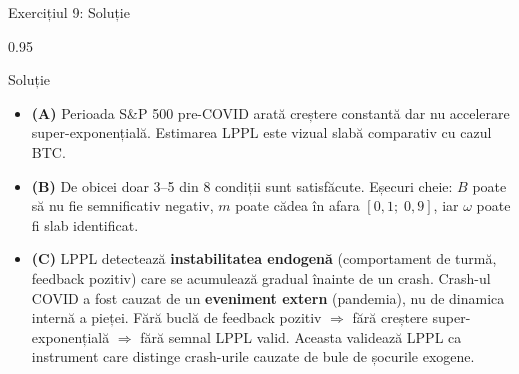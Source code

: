 \documentclass[9pt, aspectratio=169, t]{beamer}
\begin{document}
\begin{frame}{Exercițiul 9: Soluție}
    \begin{cminipage}{0.95\textwidth}
    \begin{exampleblock}{Soluție}
        {\small
        \begin{itemize}\setlength{\itemsep}{3pt}
            \item \textcolor{MainBlue}{\textbf{(A)}} Perioada S\&P 500 pre-COVID arată creștere constantă dar nu accelerare super-exponențială. Estimarea LPPL este vizual slabă comparativ cu cazul BTC.
            \item \textcolor{MainBlue}{\textbf{(B)}} De obicei doar 3--5 din 8 condiții sunt satisfăcute. Eșecuri cheie: $B$ poate să nu fie semnificativ negativ, $m$ poate cădea în afara $[0{,}1;\; 0{,}9]$, iar $\omega$ poate fi slab identificat.
            \item \textcolor{MainBlue}{\textbf{(C)}} LPPL detectează \textbf{instabilitatea endogenă} (comportament de turmă, feedback pozitiv) care se acumulează gradual înainte de un crash. Crash-ul COVID a fost cauzat de un \textbf{eveniment extern} (pandemia), nu de dinamica internă a pieței. Fără buclă de feedback pozitiv $\Rightarrow$ fără creștere super-exponențială $\Rightarrow$ fără semnal LPPL valid. Aceasta validează LPPL ca instrument care distinge crash-urile cauzate de bule de șocurile exogene.
        \end{itemize}
        }
    \end{exampleblock}
    \end{cminipage}
\end{frame}
\end{document}

